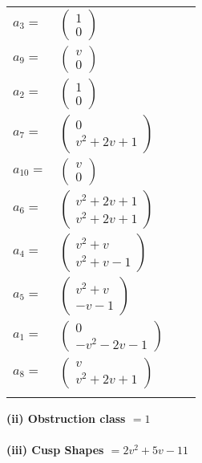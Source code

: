 \documentclass[1p]{elsarticle_modified}
\theoremstyle{definition}
\begin{document}
\begin{tabular}{m{7pt} m{180pt} m{7pt} m{180pt} }
\flushright $a_{3}=$&$\begin{pmatrix}1\\0\end{pmatrix}$ \\
\flushright $a_{9}=$&$\begin{pmatrix}v\\0\end{pmatrix}$ \\
\flushright $a_{2}=$&$\begin{pmatrix}1\\0\end{pmatrix}$ \\
\flushright $a_{7}=$&$\begin{pmatrix}0\\v^2+2 v+1\end{pmatrix}$ \\
\flushright $a_{10}=$&$\begin{pmatrix}v\\0\end{pmatrix}$ \\
\flushright $a_{6}=$&$\begin{pmatrix}v^2+2 v+1\\v^2+2 v+1\end{pmatrix}$ \\
\flushright $a_{4}=$&$\begin{pmatrix}v^2+v\\v^2+v-1\end{pmatrix}$ \\
\flushright $a_{5}=$&$\begin{pmatrix}v^2+v\\- v-1\end{pmatrix}$ \\
\flushright $a_{1}=$&$\begin{pmatrix}0\\- v^2-2 v-1\end{pmatrix}$ \\
\flushright $a_{8}=$&$\begin{pmatrix}v\\v^2+2 v+1\end{pmatrix}$\\&\end{tabular}
\flushleft \textbf{(ii) Obstruction class $= 1$}\\~\\
\flushleft \textbf{(iii) Cusp Shapes $= 2 v^2+5 v-11$}\\~\\
\end{document}
